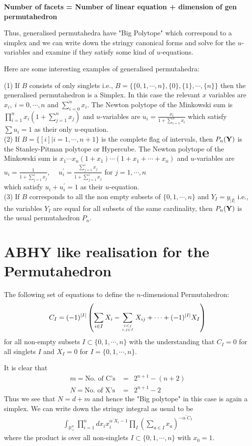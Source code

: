 \documentclass[hidelinks,12pt]{article}
\newcommand{\bea}[1]{\begin{eqnarray}\label{#1} }
\newcommand{\eea}{\end{eqnarray}}
\def\bea{\begin{eqnarray}}
\def\eea{\end{eqnarray}}
\begin{document}
{\bf Number of facets = Number of linear equation + dimension of  gen permutahedron}
 
Thus, generalised permutahedra have "Big Polytope" which correspond to a simplex and we can write down the stringy canonical forms and solve for the $u$-variables and examine if they satisfy some kind of $u$-equations.

Here are some interesting examples of generalised permutahedra:

(1) If $B$ consists of only singlets i.e., $B=\{ \{ 0,1,\cdots,n \}, \{ 0 \},\{ 1 \},\cdots ,\{ n \} \}$ then the generalised permutahedron is a Simplex. In this case the relevant $x$ variables are $x_i,~ i=0,\cdots,n$ and $\sum_{i=0}^n x_i$. 
The Newton polytope of the Minkowski sum is $\prod_{i=1}^{n} x_i (1+\sum_{j=1}^{n} x_j)$ and $u$-variables are 
$u_i =\frac{ x_i}{1+\sum_{i=1}^n x_i} $
which satisfy $\sum u_i =1$ as their only $u$-equation. \\

(2) If $B= \{[i] | i=1,\cdots,n+1 \}$ is the complete flag of intervals, then $P_n({\bf Y})$ is the Stanley-Pitman polytope or Hypercube.
The Newton polytope of the Minkowski sum is $x_1\cdots x_n (1+x_1) \cdots (1+x_1+\cdots +x_n)$ and $u$-variables are 
$u_i =\frac{ 1}{1+\sum_{j=1}^{i} x_j} $, ~~$u^{'}_i =\frac{ \sum_{j=1}^{i} x_j}{1+\sum_{j=1}^{i} x_j} $ for $j=1,\cdots,n$ \\
which satisfy $u_i +u^{'}_{i} =1$ as their $u$-equation. \\

(3) If $B$ corresponds to all the non empty subsets of $\{0,1,\cdots,n \}$ and $Y_I =y_{|I|}$ i.e., the variables $Y_I$ are equal for all subsets of the same cardinality, then $P_n({\bf Y})$ is the usual permutahedron $P_n$. 

\section*{ABHY like realisation for the Permutahedron}
The following set of equations to define the $n$-dimensional Permutahedron: 
\bea
C_I = (-1)^{|I|} \left( \sum_{i \in I} X_i - \sum _{{i<j}\atop{i,j \in I}} X_{ij} +\cdots + (-1)^{|I|}  X_I \right) \nonumber
\eea
for all non-empty subsets $I \subset \{0,1,\cdots,n\}$ with the understanding that $C_{I} =0$ for all singlets $I$ and $X_{I} =0$ for $I=\{ 0,1,\cdots,n \}$. 

It is clear that
\bea
m= \text{No. of  C's }&=& 2^{n+1}-(n+2) \nonumber \\
N= \text{No. of X's} &=& 2^{n+1}- 2 \nonumber 
\eea
Thus we see that $N= d+m$ and hence the "Big polytope" in this case is again a simplex. We can write down the stringy integral as usual to be 
\bea
\int_{\mathbb{R}^{n}_{+}} \prod_{i =1}^{n} d x_i x_i^{\alpha^{'} X_i -1} \prod_{I} \left (\sum_{a\in I} x_a \right) ^{-\alpha^{'} C_I} \nonumber
\eea 
where the product is over all non-singlets $ I \subset \{0,1,\cdots,n\}$ with $x_{0} =1$.
\end{document}
